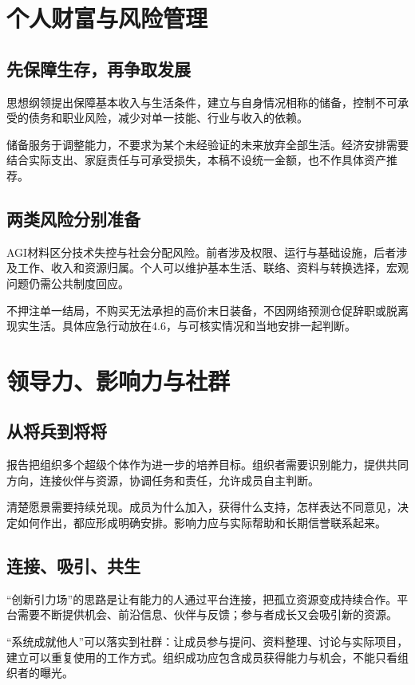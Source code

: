 \documentclass[UTF8,zihao=-4,fontset=fandol,oneside,openany]{ctexbook}
\begin{document}
\section{个人财富与风险管理}
\subsection*{先保障生存，再争取发展}
思想纲领提出保障基本收入与生活条件，建立与自身情况相称的储备，控制不可承受的债务和职业风险，减少对单一技能、行业与收入的依赖\cite{principles}。

储备服务于调整能力，不要求为某个未经验证的未来放弃全部生活。经济安排需要结合实际支出、家庭责任与可承受损失，本稿不设统一金额，也不作具体资产推荐。

\subsection*{两类风险分别准备}
AGI材料区分技术失控与社会分配风险。前者涉及权限、运行与基础设施，后者涉及工作、收入和资源归属。个人可以维护基本生活、联络、资料与转换选择，宏观问题仍需公共制度回应。

不押注单一结局，不购买无法承担的高价末日装备，不因网络预测仓促辞职或脱离现实生活。具体应急行动放在4.6，与可核实情况和当地安排一起判断。

\section{领导力、影响力与社群}
\subsection*{从将兵到将将}
报告把组织多个超级个体作为进一步的培养目标。组织者需要识别能力，提供共同方向，连接伙伴与资源，协调任务和责任，允许成员自主判断\cite{xiong}。

清楚愿景需要持续兑现。成员为什么加入，获得什么支持，怎样表达不同意见，决定如何作出，都应形成明确安排。影响力应与实际帮助和长期信誉联系起来。

\subsection*{连接、吸引、共生}
“创新引力场”的思路是让有能力的人通过平台连接，把孤立资源变成持续合作。平台需要不断提供机会、前沿信息、伙伴与反馈；参与者成长又会吸引新的资源。

“系统成就他人”可以落实到社群：让成员参与提问、资料整理、讨论与实际项目，建立可以重复使用的工作方式。组织成功应包含成员获得能力与机会，不能只看组织者的曝光。
\end{document}
